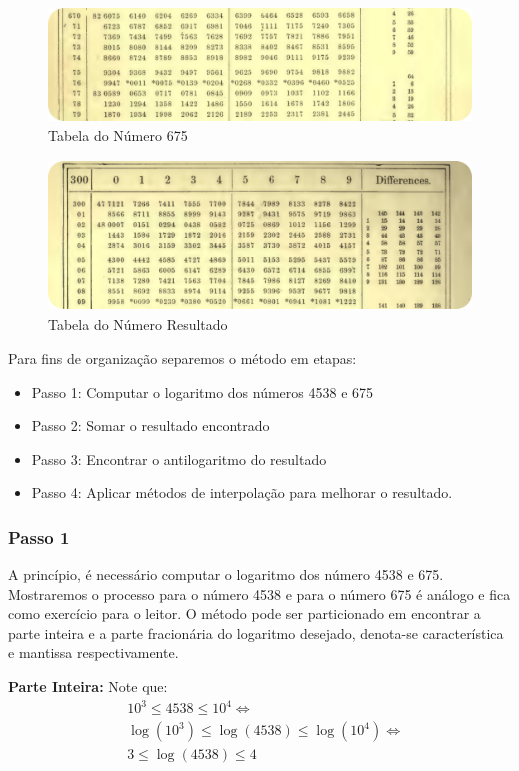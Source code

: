 \begin{figure}[H]
    \centering
    \includegraphics[height=3cm]{img/675.png}
    \caption{Tabela do Número 675}
\end{figure}

\begin{figure}[H]
    \centering
    \includegraphics[height=4cm]{img/res.png}
    \caption{Tabela do Número Resultado}
\end{figure}

Para fins de organização separemos o método em etapas:

\begin{itemize}
    \item Passo 1: Computar o logaritmo dos números 4538 e 675
    \item Passo 2: Somar o resultado encontrado
    \item Passo 3: Encontrar o antilogaritmo do resultado
    \item Passo 4: Aplicar métodos de interpolação para melhorar o resultado.
\end{itemize}

\subsubsection{Passo 1}
A princípio, é necessário computar o logaritmo dos número 4538 e 675. Mostraremos o processo para o número 4538 e para o número 675 é análogo e fica como exercício para o leitor. O método pode ser particionado em encontrar a parte inteira e a parte fracionária do logaritmo desejado, denota-se característica e mantissa respectivamente.

\textbf{Parte Inteira:}
Note que:
\begin{align*}
    & 10^3 \le 4538 \le 10^4 \iff \\
    & \log(10^3) \le \log(4538) \le \log(10^4) \iff \\
    & 3 \le \log(4538) \le 4
\end{align*}

